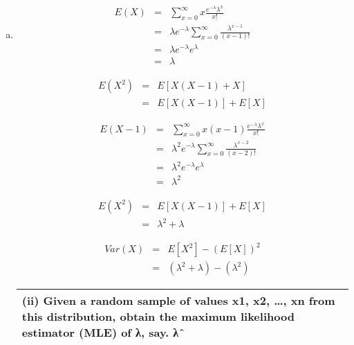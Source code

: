 \documentclass[a4paper,12pt]{article}
\begin{document}
\begin{enumerate}[(a)]
\item 

\begin{multicols}{2}
\begin{eqnarray*}
E(X) &=&  \sum^{\infty}_{x=0} x \frac{e^{-\lambda}\lambda^{x}}{x!}  \\
&=&  \lambda e^{-\lambda}\sum^{\infty}_{x=0} \frac{\lambda^{x-1}}{(x-1)!}  \\
&=& \lambda e^{-\lambda} e^{\lambda}\\
&=& \lambda
\end{eqnarray*}

\begin{eqnarray*} E(X^2) &=& E[X(X-1) + X] \\ &=& E[X(X-1)] + E[X] 
\end{eqnarray*}
\end{multicols}

\begin{multicols}{2}
\begin{eqnarray*}
E(X-1) &=&  \sum^{\infty}_{x=0} x(x-1)\frac{e^{-\lambda}\lambda^{x}}{x!}  \\
&=&  \lambda^2 e^{-\lambda}\sum^{\infty}_{x=0} \frac{\lambda^{x-2}}{(x-2)!}  \\
&=& \lambda^2 e^{-\lambda} e^{\lambda}\\
&=& \lambda^2
\end{eqnarray*}

\begin{eqnarray*} E(X^2) &=& E[X(X-1)] + E[X] \\ &=& \lambda^2 + \lambda \end{eqnarray*}

\begin{eqnarray*}Var(X) &=& E[X^2] - (E[X])^2 \\ &=& (\lambda^2 + \lambda)- (\lambda^2) \end{eqnarray*}
\end{multicols}

\newpage
\begin{table}[ht!]
\centering

\begin{tabular}{|p{15cm}|}
\hline        

\noindent

(ii) Given a random sample of values x1, x2, …, xn from this distribution, obtain the maximum likelihood estimator (MLE) of λ, say. λˆ
\\ \hline
      

\end{tabular}
\end{table}
\end{enumerate}
\end{document}
